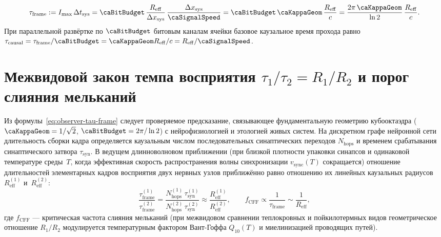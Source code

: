 \begin{theorem}
\begin{enumerate}[leftmargin=*]
  \begin{equation}
  \label{eq:observer-tau-frame}
    \tau_{\mathrm{frame}} := I_{\max}\,\Delta t_{\mathrm{sys}}
    = \caBitBudget\,\frac{R_{\mathrm{eff}}}{\Delta x_{\mathrm{sys}}}\,\frac{\Delta x_{\mathrm{sys}}}{\caSignalSpeed}
    = \caBitBudget\,\caKappaGeom\,\frac{R_{\mathrm{eff}}}{c}
    = \frac{2\pi\,\caKappaGeom}{\ln 2}\,\frac{R_{\mathrm{eff}}}{c}.
  \end{equation}
  При параллельной развёртке по $\caBitBudget$ битовым каналам ячейки базовое каузальное время прохода равно $\tau_{\mathrm{causal}} = \tau_{\mathrm{frame}}/\caBitBudget = \caKappaGeom R_{\mathrm{eff}}/c = R_{\mathrm{eff}}/\caSignalSpeed$.
\end{enumerate}
\end{theorem}

\chapter{Межвидовой закон темпа восприятия \texorpdfstring{$\tau_1/\tau_2 = R_1/R_2$}{tau1/tau2 = R1/R2} и порог слияния мельканий}
\label{ch:observer-species-scaling}

Из формулы~\eqref{eq:observer-tau-frame} следует проверяемое предсказание, связывающее фундаментальную геометрию кубооктаэдра ($\caKappaGeom = 1/\sqrt{2}$, $\caBitBudget = 2\pi/\ln 2$) с нейрофизиологией и этологией живых систем.
На дискретном графе нейронной сети длительность сборки кадра определяется каузальным числом последовательных синаптических переходов $N_{\mathrm{hops}}$ и временем срабатывания синаптического затвора $\tau_{\mathrm{syn}}$. В ведущем длинноволновом приближении (при близкой плотности упаковки синапсов и одинаковой температуре среды~$T$, когда эффективная скорость распространения волны синхронизации $v_{\mathrm{sync}}(T)$ сокращается) отношение длительностей элементарных кадров восприятия двух нервных узлов приближённо равно отношению их линейных каузальных радиусов $R_{\mathrm{eff}}^{(1)}$ и~$R_{\mathrm{eff}}^{(2)}$:
\begin{equation}
\label{eq:observer-species-ratio}
  \frac{\tau_{\mathrm{frame}}^{(1)}}{\tau_{\mathrm{frame}}^{(2)}}
  = \frac{N_{\mathrm{hops}}^{(1)}\,\tau_{\mathrm{syn}}^{(1)}}{N_{\mathrm{hops}}^{(2)}\,\tau_{\mathrm{syn}}^{(2)}}
  \approx \frac{R_{\mathrm{eff}}^{(1)}}{R_{\mathrm{eff}}^{(2)}},
  \qquad
  f_{\mathrm{CFF}} \propto \frac{1}{\tau_{\mathrm{frame}}} \sim \frac{1}{R_{\mathrm{eff}}},
\end{equation}
где $f_{\mathrm{CFF}}$ --- критическая частота слияния мельканий (при межвидовом сравнении теплокровных и пойкилотермных видов геометрическое отношение $R_1/R_2$ модулируется температурным фактором Вант-Гоффа $Q_{10}(T)$ и миелинизацией проводящих путей).

